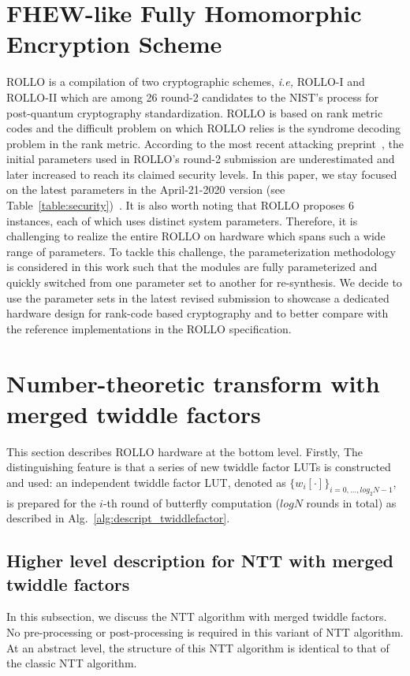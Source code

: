 \documentclass[submission]{iacrtrans}
\theoremstyle{plain}
\begin{document}
\section{FHEW-like Fully Homomorphic Encryption Scheme}
ROLLO is a compilation of two cryptographic schemes, \textit{i.e,} ROLLO-I and ROLLO-II which are among 26 round-2 candidates to the NIST's process for post-quantum cryptography standardization. ROLLO is based on rank metric codes and the difficult problem on which ROLLO relies is the syndrome decoding problem in the rank metric.
According to the most recent attacking preprint~\cite{bardet2020algebraic2}, the initial parameters used in ROLLO's round-2 submission are underestimated and later increased to reach its claimed security levels. In this paper, we stay focused on the latest parameters in the April-21-2020 version (see Table~\ref{table:security})~\cite{gaborit2017rollo}. It is also worth noting that ROLLO proposes 6 instances, each of which uses distinct system parameters. Therefore, it is challenging to realize the entire ROLLO on hardware which spans such a wide range of parameters. To tackle this challenge, the parameterization methodology is considered in this work such that the modules are fully parameterized and quickly switched from one parameter set to another for re-synthesis. We decide to use the parameter sets in the latest revised submission to showcase a dedicated hardware design for rank-code based cryptography and to better compare with the reference implementations in the ROLLO specification.

 

\section{Number-theoretic transform with merged twiddle factors}
This section describes ROLLO hardware at the bottom level. Firstly,  The distinguishing feature is that a series of new twiddle factor LUTs  is constructed and used:  an independent twiddle factor LUT, denoted as $\{w_i[\cdot]\}_{i=0,\ldots,log_2N-1}$, is prepared for the $i$-th round of butterfly computation ($logN$ rounds in total) as described in Alg.~\ref{alg:descript_twiddlefactor}.

\subsection{Higher level description for NTT with merged twiddle factors}\label{sec:gf2m_arith}

In this subsection, we discuss the NTT algorithm with merged twiddle factors. No pre-processing or post-processing is required in this variant of NTT algorithm. At an abstract level, the structure of this NTT algorithm is identical to that of the classic NTT algorithm. 
\end{document}
